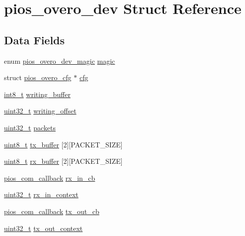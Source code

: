 \hypertarget{structpios__overo__dev}{\section{pios\-\_\-overo\-\_\-dev Struct Reference}
\label{structpios__overo__dev}
}
\subsection*{Data Fields}
\begin{DoxyCompactItemize}
\item 
enum \hyperlink{group___p_i_o_s___o_v_e_r_o_ga9b9fb7573bead7d69299823fb7f7a372}{pios\-\_\-overo\-\_\-dev\-\_\-magic} \hyperlink{structpios__overo__dev_a6d9be49c3c20b721ac63620ce90d30ae}{magic}
\item 
struct \hyperlink{structpios__overo__cfg}{pios\-\_\-overo\-\_\-cfg} $\ast$ \hyperlink{structpios__overo__dev_a8bb10a548957bcd5da841fcd655b14d2}{cfg}
\item 
\hyperlink{stdint_8h_ad566f6541e98b74246db1a3a3a85ad49}{int8\-\_\-t} \hyperlink{structpios__overo__dev_a87dbb1f454559bb6df624368972b0cf6}{writing\-\_\-buffer}
\item 
\hyperlink{stdint_8h_a435d1572bf3f880d55459d9805097f62}{uint32\-\_\-t} \hyperlink{structpios__overo__dev_a8fc21eb0e95dfbe473205d659e4678f4}{writing\-\_\-offset}
\item 
\hyperlink{stdint_8h_a435d1572bf3f880d55459d9805097f62}{uint32\-\_\-t} \hyperlink{structpios__overo__dev_ad0b4a0ccb4fb05b14cc21805b5dbe9b9}{packets}
\item 
\hyperlink{stdint_8h_aba7bc1797add20fe3efdf37ced1182c5}{uint8\-\_\-t} \hyperlink{structpios__overo__dev_a48dfcb09b1a3c648ab7d1e2c79f4094e}{tx\-\_\-buffer} \mbox{[}2\mbox{]}\mbox{[}P\-A\-C\-K\-E\-T\-\_\-\-S\-I\-Z\-E\mbox{]}
\item 
\hyperlink{stdint_8h_aba7bc1797add20fe3efdf37ced1182c5}{uint8\-\_\-t} \hyperlink{structpios__overo__dev_a638ed3a9ebc43e2ce3477041a7f68a95}{rx\-\_\-buffer} \mbox{[}2\mbox{]}\mbox{[}P\-A\-C\-K\-E\-T\-\_\-\-S\-I\-Z\-E\mbox{]}
\item 
\hyperlink{group___p_i_o_s___c_o_m_ga23f1888821f1f74a50c02adc459df597}{pios\-\_\-com\-\_\-callback} \hyperlink{structpios__overo__dev_acba008cacb6d3478462b4c681b60a158}{rx\-\_\-in\-\_\-cb}
\item 
\hyperlink{stdint_8h_a435d1572bf3f880d55459d9805097f62}{uint32\-\_\-t} \hyperlink{structpios__overo__dev_acd9b0fbbf1587d730b3a91eaeee52253}{rx\-\_\-in\-\_\-context}
\item 
\hyperlink{group___p_i_o_s___c_o_m_ga23f1888821f1f74a50c02adc459df597}{pios\-\_\-com\-\_\-callback} \hyperlink{structpios__overo__dev_a6814eae0437a37c8b5319b0ef88b7459}{tx\-\_\-out\-\_\-cb}
\item 
\hyperlink{stdint_8h_a435d1572bf3f880d55459d9805097f62}{uint32\-\_\-t} \hyperlink{structpios__overo__dev_aae8b1053ce480f2829ac18c7a490c010}{tx\-\_\-out\-\_\-context}
\end{DoxyCompactItemize}


